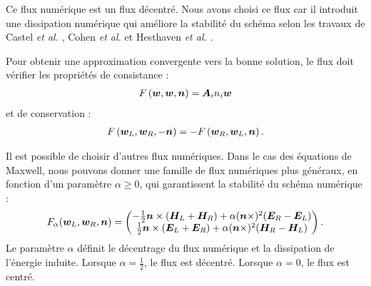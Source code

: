 Ce flux numérique est un flux décentré.
Nous avons choisi ce flux car il introduit une dissipation
numérique qui améliore la stabilité du schéma selon les travaux de
Castel \textit{et al.} \cite{castel:hal-00403787},
Cohen \textit{et al.} \cite{Coh-Fer-Per-2006-1} et
Hesthaven \textit{et al.} \cite{Hesthaven493}.

Pour obtenir une approximation convergente vers la bonne solution,
le flux doit vérifier les propriétés de consistance :
\begin{align}
	F\left(\bm{w},\bm{w},\bm{n}\right) = {\bm{A}_{i}n_{i}} \bm{w}
	\label{eq:flux_consistance}
\end{align}
et de conservation :
\begin{align}
	F\left(\bm{w}_L,\bm{w}_R,-\bm{n}\right) = - F\left(\bm{w}_R,\bm{w}_L,\bm{n}\right)
	\label{eq:flux_conservation} .
\end{align}

Il est possible de choisir d’autres flux numériques.
Dans le cas des équations de Maxwell, nous pouvons donner
une famille de flux numériques plus généraux, en fonction d’un paramètre
$\alpha \ge 0$, qui garantissent la stabilité
du schéma numérique :
\begin{align}
	F_\alpha (\bm{w}_L, \bm{w}_R, \bm{n}) =
	\begin{pmatrix}
		- \frac{1}{2} \bm{n} \times (\bm{H}_L + \bm{H}_R)
		+ \alpha (\bm{n} \times)^2 (\bm{E}_R - \bm{E}_L) \\
		\frac{1}{2} \bm{n} \times (\bm{E}_L + \bm{E}_R)
		+ \alpha (\bm{n} \times)^2 (\bm{H}_R - \bm{H}_L)
	\end{pmatrix} .
\end{align}
Le paramètre $\alpha$ définit le décentrage du flux numérique et la
dissipation de l’énergie induite.
Lorsque $\alpha = \frac{1}{2}$, le flux est décentré.
Lorsque $\alpha = 0$, le flux est centré.

